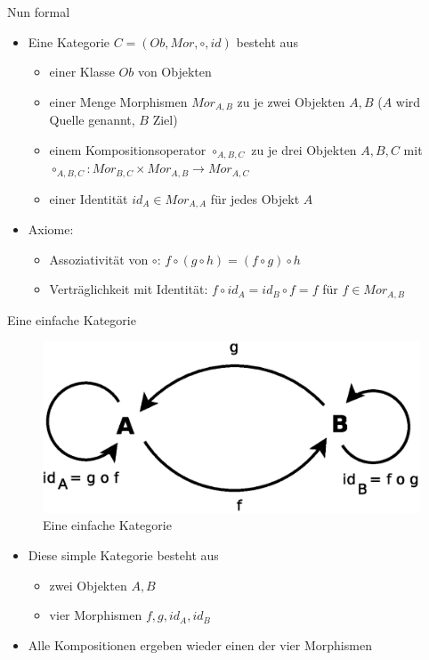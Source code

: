 \documentclass{beamer}
\begin{document}
\begin{frame}{Nun formal}
  \begin{itemize}
  \item Eine Kategorie $C = (Ob, Mor, \circ, id)$ besteht aus  
    \begin{itemize}
    \item einer Klasse $Ob$ von Objekten
    \item einer Menge Morphismen $Mor_{A,B}$ zu je zwei Objekten $A, B$
      ($A$ wird Quelle genannt, $B$ Ziel)
    \item einem Kompositionsoperator $\circ_{A,B,C}$ zu je drei Objekten
      $A, B, C$ mit 
      $\circ_{A,B,C} : Mor_{B,C} \times Mor_{A,B} \rightarrow Mor_{A,C}$
    \item einer Identität $id_A \in Mor_{A,A}$ für jedes Objekt $A$
    \end{itemize}

  \item Axiome:
    \begin{itemize}
    \item Assoziativität von $\circ$:
      $f \circ (g \circ h) = (f \circ g) \circ h$
    \item Verträglichkeit mit Identität:
      $f \circ id_A = id_B \circ f = f$ für $f \in Mor_{A,B}$
    \end{itemize}
  \end{itemize}
\end{frame}

\begin{frame}{Eine einfache Kategorie}
  \begin{figure}
    \centering
    \includegraphics[scale=0.4]{images/cat_simple}
    \caption{Eine einfache Kategorie}
  \end{figure}
  \begin{itemize}
  \item Diese simple Kategorie besteht aus
    \begin{itemize}
    \item zwei Objekten $A, B$
    \item vier Morphismen $f, g, id_A, id_B$
    \end{itemize}
  \item Alle Kompositionen ergeben wieder einen der vier Morphismen
  \end{itemize}
\end{frame}
\end{document}
